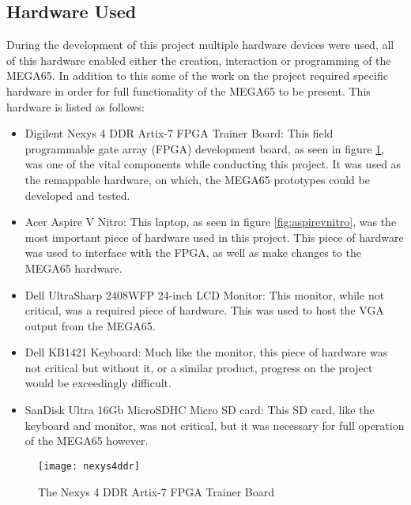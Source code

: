 \label{Ch3 Sec2}

\subsection{Hardware Used}

\label{Ch3 Sec2 Sub1}

During the development of this project multiple hardware devices were used, all of this hardware enabled either the creation, interaction or programming of the MEGA65. In addition to this some of the work on the project required specific hardware in order for full functionality of the MEGA65 to be present. This hardware is listed as follows:\\

\begin{itemize}
\item{Digilent Nexys 4 DDR Artix-7 FPGA Trainer Board: This field programmable gate array (FPGA) development board, as seen in figure \ref{fig:nexys4ddr}, was one of the vital components while conducting this project. It was used as the remappable hardware, on which, the MEGA65 prototypes could be developed and tested.}
\item{Acer Aspire V Nitro: This laptop, as seen in figure \ref{fig:aspirevnitro}, was the most important piece of hardware used in this project. This piece of hardware was used to interface with the FPGA, as well as make changes to the MEGA65 hardware.}
\item{Dell UltraSharp 2408WFP 24-inch LCD Monitor: This monitor, while not critical, was a required piece of hardware. This was used to host the VGA output from the MEGA65.}
\item{Dell KB1421 Keyboard: Much like the monitor, this piece of hardware was not critical but without it, or a similar product, progress on the project would be exceedingly difficult.}
\item{SanDisk Ultra 16Gb MicroSDHC Micro SD card: This SD card, like the keyboard and monitor, was not critical, but it was necessary for full operation of the MEGA65 however.}
\end{itemize}

\begin{figure}
  \centering
  \texttt{[image: nexys4ddr]}
  \caption{The Nexys 4 DDR Artix-7 FPGA Trainer Board}
  \label{fig:nexys4ddr}
\end{figure}

